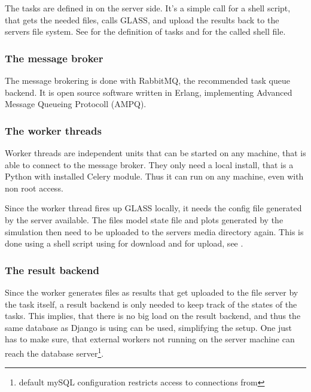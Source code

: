 
The tasks are defined in  on the server side.
It's a simple call for a shell script, that gets the needed files, calls GLASS, and upload the results back to the servers file system.
See  for the definition of tasks and  for the called shell file.



\subsubsection{The message broker}

The message brokering is done with RabbitMQ, the recommended task queue backend.
It is open source software written in Erlang, implementing Advanced Message Queueing Protocoll (AMPQ).

\subsubsection{The worker threads}

Worker threads are independent units that can be started on any machine, that is able to connect to the message broker. They only need a local install, that is a Python with installed Celery module.
Thus it can run on any machine, even with non root access.

Since the worker thread fires up GLASS locally, it needs the config file generated by the server available. The files model state file and plots generated by the simulation then need to be uploaded to the servers media directory again.
This is done using a shell script using  for download and  for upload, see .




\subsubsection{The result backend}
Since the worker generates files as results that get uploaded to the file server by the task itself, a result backend is only needed to keep track of the states of the tasks.
This implies, that there is no big load on the result backend, and thus the same database as Django is using can be used, simplifying the setup.
One just has to make sure, that external workers not running on the server machine can reach the database server\footnote{default mySQL configuration restricts access to connections from }.




